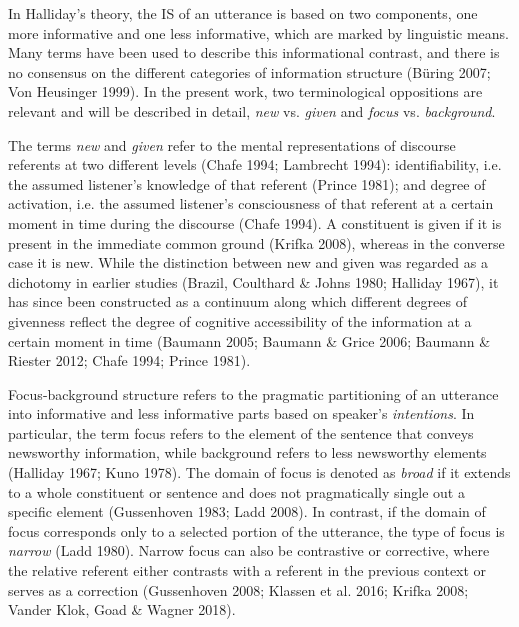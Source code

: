 \begin{styleStandard}
In Halliday’s theory, the IS of an utterance is based on two components, one more informative and one less informative, which are marked by linguistic means. Many terms have been used to describe this informational contrast, and there is no consensus on the different categories of information structure (Büring 2007; Von Heusinger 1999). In the present work, two terminological oppositions are relevant and will be described in detail, \textit{new} vs. \textit{given} and \textit{focus} vs. \textit{background}.
\end{styleStandard}

\begin{styleStandard}
The terms \textit{new} and \textit{given} refer to the mental representations of discourse referents at two different levels (Chafe 1994; Lambrecht 1994): identifiability, i.e. the assumed listener’s knowledge of that referent (Prince 1981); and degree of activation, i.e. the assumed listener’s consciousness of that referent at a certain moment in time during the discourse (Chafe 1994). A constituent is given if it is present in the immediate common ground (Krifka 2008), whereas in the converse case it is new. While the distinction between new and given was regarded as a dichotomy in earlier studies (Brazil, Coulthard \& Johns 1980; Halliday 1967), it has since been constructed as a continuum along which different degrees of givenness reflect the degree of cognitive accessibility of the information at a certain moment in time (Baumann 2005; Baumann \& Grice 2006; Baumann \& Riester 2012; Chafe 1994; Prince 1981).
\end{styleStandard}

\begin{styleStandard}
Focus-background structure refers to the pragmatic partitioning of an utterance into informative and less informative parts based on speaker’s \textit{intentions}. In particular, the term focus refers to the element of the sentence that conveys newsworthy information, while background refers to less newsworthy elements (Halliday 1967; Kuno 1978). The domain of focus is denoted as \textit{broad} if it extends to a whole constituent or sentence and does not pragmatically single out a specific element (Gussenhoven 1983; Ladd 2008). In contrast, if the domain of focus corresponds only to a selected portion of the utterance, the type of focus is \textit{narrow} (Ladd 1980). Narrow focus can also be contrastive or corrective, where the relative referent either contrasts with a referent in the previous context or serves as a correction (Gussenhoven 2008; Klassen et al. 2016; Krifka 2008; Vander Klok, Goad \& Wagner 2018).
\end{styleStandard}

